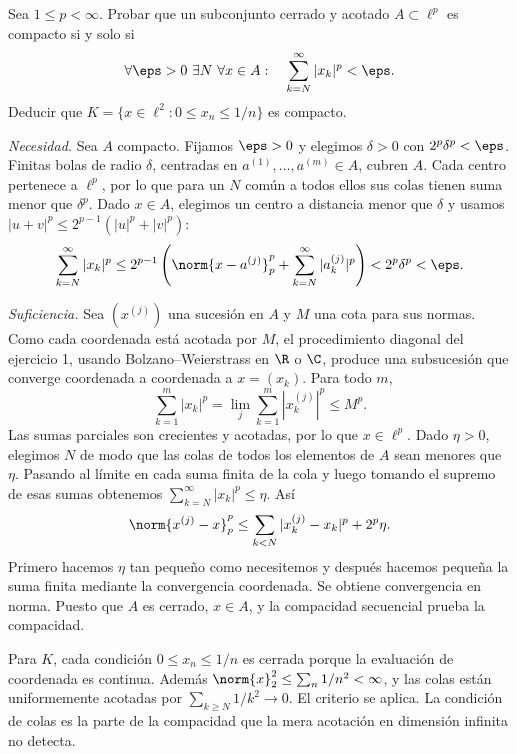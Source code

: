 \begin{ejercicio}
Sea $1\le p<\infty$. Probar que un subconjunto cerrado y acotado $A\subset\ell^p$ es compacto si y solo si
\[
\forall\eps>0\ \exists N\ \forall x\in A:\quad
\sum_{k=N}^\infty |x_k|^p<\eps.
\]
Deducir que $K=\{x\in\ell^2:0\le x_n\le1/n\}$ es compacto.
\end{ejercicio}
\begin{solucion}
\emph{Necesidad.} Sea $A$ compacto. Fijamos $\eps>0$ y elegimos $\delta>0$ con $2^p\delta^p<\eps$. Finitas bolas de radio $\delta$, centradas en $a^{(1)},\ldots,a^{(m)}\in A$, cubren $A$. Cada centro pertenece a $\ell^p$, por lo que para un $N$ común a todos ellos sus colas tienen suma menor que $\delta^p$. Dado $x\in A$, elegimos un centro a distancia menor que $\delta$ y usamos $|u+v|^p\le2^{p-1}(|u|^p+|v|^p)$:
\[
\sum_{k=N}^\infty|x_k|^p
\le2^{p-1}\left(\norm{x-a^{(j)}}_p^p+
\sum_{k=N}^\infty|a_k^{(j)}|^p\right)<2^p\delta^p<\eps.
\]

\emph{Suficiencia.} Sea $(x^{(j)})$ una sucesión en $A$ y $M$ una cota para sus normas. Como cada coordenada está acotada por $M$, el procedimiento diagonal del ejercicio 1, usando Bolzano--Weierstrass en $\R$ o $\C$, produce una subsucesión que converge coordenada a coordenada a $x=(x_k)$. Para todo $m$,
\[
\sum_{k=1}^m|x_k|^p=\lim_j\sum_{k=1}^m|x_k^{(j)}|^p\le M^p.
\]
Las sumas parciales son crecientes y acotadas, por lo que $x\in\ell^p$. Dado $\eta>0$, elegimos $N$ de modo que las colas de todos los elementos de $A$ sean menores que $\eta$. Pasando al límite en cada suma finita de la cola y luego tomando el supremo de esas sumas obtenemos $\sum_{k=N}^\infty|x_k|^p\le\eta$. Así
\[
\norm{x^{(j)}-x}_p^p
\le\sum_{k<N}|x_k^{(j)}-x_k|^p+2^p\eta.
\]
Primero hacemos $\eta$ tan pequeño como necesitemos y después hacemos pequeña la suma finita mediante la convergencia coordenada. Se obtiene convergencia en norma. Puesto que $A$ es cerrado, $x\in A$, y la compacidad secuencial prueba la compacidad.

Para $K$, cada condición $0\le x_n\le1/n$ es cerrada porque la evaluación de coordenada es continua. Además $\norm{x}_2^2\le\sum_n1/n^2<\infty$, y las colas están uniformemente acotadas por $\sum_{k\ge N}1/k^2\to0$. El criterio se aplica. La condición de colas es la parte de la compacidad que la mera acotación en dimensión infinita no detecta.
\end{solucion}

